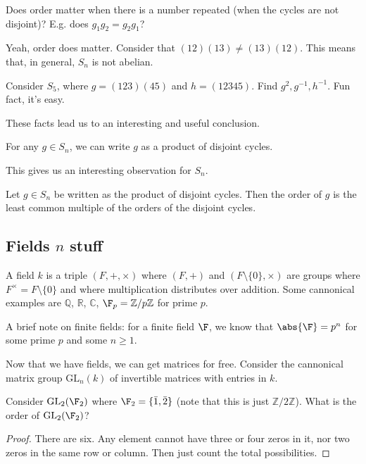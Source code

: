 \begin{problem}
Does order matter when there is a number repeated (when the cycles are not disjoint)? E.g. does $g_1g_2 = g_2g_1$?
\end{problem}
\begin{solution}
Yeah, order does matter. Consider that $(12)(13) \not= (13)(12)$. This means that, in general, $S_n$ is not abelian.
\end{solution}

\begin{problem}
Consider $S_5$, where $g = (123)(45)$ and $h = (12345)$. Find $g^2, g^{-1}, h^{-1}$. Fun fact, it's easy.
\end{problem}

These facts lead us to an interesting and useful conclusion.
\begin{proposition}
For any $g \in S_n$, we can write $g$ as a product of disjoint cycles.
\end{proposition}

This gives us an interesting observation for $S_n$.

\begin{proposition}
Let $g \in S_n$ be written as the product of disjoint cycles. Then the order of $g$ is the least common multiple of the orders of the disjoint cycles.
\end{proposition}

\subsection{Fields \texorpdfstring{$n$}{n} stuff}

\begin{definition}
A field $k$ is a triple $(F, +, \times)$ where $(F,+)$ and $(F \setminus \{0\},\times)$ are groups where $F^\times = F \setminus \{0\}$ and where multiplication distributes over addition. Some cannonical examples are $\mathbb{Q}$, $\mathbb{R}$, $\mathbb{C}$, $\F_p = \mathbb{Z}/p\mathbb{Z}$ for prime $p$.
\end{definition}

A brief note on finite fields: for a finite field $\F$, we know that $\abs{\F} = p^n$ for some prime $p$ and some $n \geq 1$.

Now that we have fields, we can get matrices for free. Consider the cannonical matrix group $\mathrm{GL}_n(k)$ of invertible matrices with entries in $k$.

\begin{example}
Consider $\mathrm{GL}_2(\F_2)$ where $\F_2 = \{\bar{1}, \bar{2}\}$ (note that this is just $\mathbb{Z} / 2\mathbb{Z}$). What is the order of $\mathrm{GL}_2(\F_2)$?
\end{example}

\begin{proof}
There are six. Any element cannot have three or four zeros in it, nor two zeros in the same row or column. Then just count the total possibilities.
\end{proof}